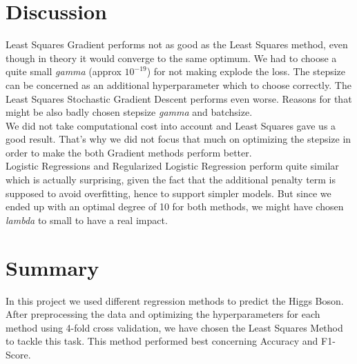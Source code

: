\documentclass[10pt,conference,compsocconf]{IEEEtran}
\begin{document}
\section{Discussion}

 
Least Squares Gradient performs not as good as the Least Squares method, even though in theory it would converge to the same optimum. We had to choose a quite small \textit{gamma} (approx $10^{-19}$) for not making explode the loss. The stepsize can be concerned as an additional hyperparameter which to choose correctly. The Least Squares Stochastic Gradient Descent performs even worse. Reasons for that might be also badly chosen stepsize \textit{gamma} and batchsize.\\
We did not take computational cost into account and Least Squares gave us a good result. That's why we did not focus that much on optimizing the stepsize in order to make the both Gradient methods perform better. \\
Logistic Regressions and Regularized Logistic Regression perform quite similar which is actually surprising, given the fact that the additional penalty term is supposed to avoid overfitting, hence to support simpler models. But since we ended up with an optimal degree of 10 for both methods, we might have chosen \textit{lambda} to small to have a real impact.


\section{Summary}

In this project we used different regression methods to predict the Higgs Boson. After preprocessing the data and optimizing the hyperparameters for each method using 4-fold cross validation, we have chosen the Least Squares Method to tackle this task. This method performed best concerning Accuracy and F1-Score.



%
%
\end{document}
